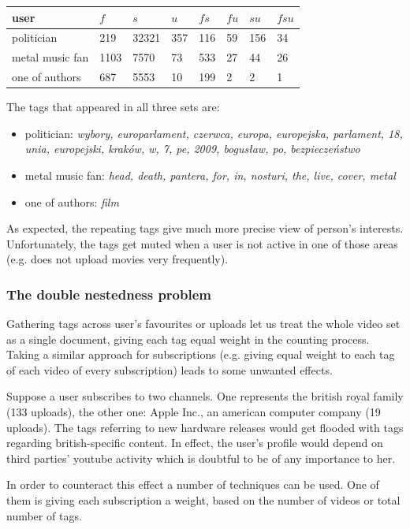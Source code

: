 \documentclass{article}
\begin{document}
\begin{tabular}{| l | l | l | l | l | l | l | l |}
user & $f$ & $s$ & $u$ & $fs$ & $fu$ & $su$ & $fsu$ \\ \hline
politician & 219 & 32321 & 357 & 116 & 59 & 156 & 34 \\
metal music fan & 1103 & 7570 & 73 & 533 & 27 & 44 & 26 \\
one of authors & 687 & 5553 & 10 & 199 & 2 & 2 & 1 \\
\end{tabular}

The tags that appeared in all three sets are:
\begin{itemize}
  \item{politician: \emph{wybory, europarlament, czerwca, europa, europejska,
  parlament, 18, unia, europejski, kraków, w, 7, pe, 2009, bogusław, po,
  bezpieczeństwo}}
  \item{metal music fan: \emph{head, death, pantera, for, in, nosturi, the, live, cover, metal}}
  \item{one of authors: \emph{film}}
\end{itemize}

As expected, the repeating tags give much more precise view of person's
interests. Unfortunately, the tags get muted when a user is not active in one of
those areas (e.g. does not upload movies very frequently).

\subsubsection{The double nestedness problem}
Gathering tags across user's favourites or uploads let us treat the whole video
set as a single document, giving each tag equal weight in the counting process.
Taking a similar approach for subscriptions (e.g. giving equal weight to each
tag of each video of every subscription) leads to some unwanted effects.

Suppose a user subscribes to two channels. One represents the british royal
family (133 uploads), the other one: Apple Inc., an american computer company
(19 uploads). The tags referring to new hardware releases would get flooded with
tags regarding british-specific content. In effect, the user's profile would
depend on third parties' youtube activity which is doubtful to be of any
importance to her.

In order to counteract this effect a number of techniques can be used. One of
them is giving each subscription a weight, based on the number of videos or
total number of tags.
\end{document}
